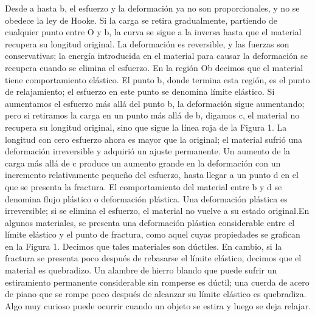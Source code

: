 \documentclass[11pt,a4paper]{article}
\begin{document}
Desde a hasta b, el esfuerzo y la deformaci\'{o}n ya no son proporcionales, y no se obedece la ley de Hooke. Si la carga se retira gradualmente, partiendo de cualquier punto entre O y b, la curva se sigue a la inversa hasta que el material recupera su longitud original. La deformaci\'{o}n es reversible, y las fuerzas son conservativas; la energ\'{i}a introducida en el material para causar la deformaci\'{o}n se recupera cuando se elimina el esfuerzo. En la regi\'{o}n Ob decimos que el material tiene comportamiento el\'{a}stico. El punto b, donde termina esta regi\'{o}n, es el punto de relajamiento; el esfuerzo en este punto se denomina l\'{i}mite el\'{a}stico. Si aumentamos el esfuerzo m\'{a}s all\'{a} del punto b, la deformaci\'{o}n sigue aumentando; pero si retiramos la carga en un punto m\'{a}s all\'{a} de b, digamos c, el material no recupera su longitud original, sino que sigue la l\'{i}nea roja de la Figura 1. La longitud con cero esfuerzo ahora es mayor que la original; el material sufri\'{o} una deformaci\'{o}n irreversible y adquiri\'{o} un ajuste permanente. Un aumento de la carga m\'{a}s all\'{a} de c produce un aumento grande en la deformaci\'{o}n con un incremento relativamente peque\~{n}o del esfuerzo, hasta llegar a un punto d en el que se presenta la fractura. El comportamiento del material entre b y d se denomina flujo pl\'{a}stico o deformaci\'{o}n pl\'{a}stica. Una deformaci\'{o}n pl\'{a}stica es irreversible; si se elimina el esfuerzo, el material no vuelve a su estado original.En algunos materiales, se presenta una deformaci\'{o}n pl\'{a}stica considerable entre el l\'{i}mite el\'{a}stico y el punto de fractura, como aquel cuyas propiedades se grafican en la Figura 1. Decimos que tales materiales son d\'{u}ctiles. En cambio, si la fractura se presenta poco despu\'{e}s de rebasarse el l\'{i}mite el\'{a}stico, decimos que el material es quebradizo. Un alambre de hierro blando que puede sufrir un estiramiento permanente considerable sin romperse es d\'{u}ctil; una cuerda de acero de piano que se rompe poco despu\'{e}s de alcanzar su l\'{i}mite el\'{a}stico es quebradiza. Algo muy curioso puede ocurrir cuando un objeto se estira y luego se deja relajar.\\
\end{document}
